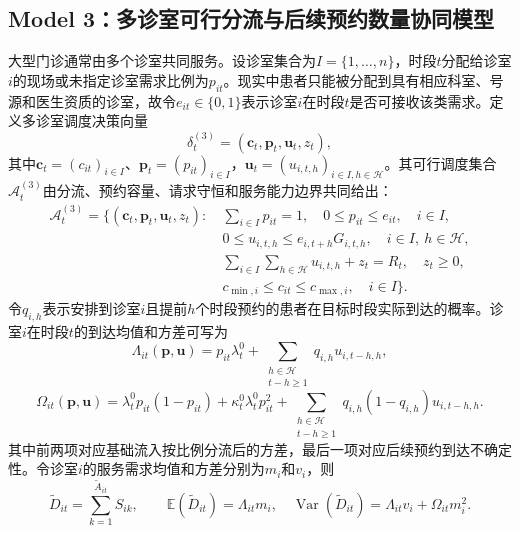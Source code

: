 \documentclass[a4paper,zihao=-4]{ctexart}
\newcommand{\E}{\mathbb{E}}
\newcommand{\Var}{\operatorname{Var}}
\numberwithin{figure}{section}
\numberwithin{table}{section}
\begin{document}
\subsection{Model 3：多诊室可行分流与后续预约数量协同模型}

大型门诊通常由多个诊室共同服务。设诊室集合为$I=\{1,\ldots,n\}$，时段$t$分配给诊室$i$的现场或未指定诊室需求比例为$p_{it}$。现实中患者只能被分配到具有相应科室、号源和医生资质的诊室，故令$e_{it}\in\{0,1\}$表示诊室$i$在时段$t$是否可接收该类需求。定义多诊室调度决策向量
\begin{equation}
\delta_t^{(3)}=(\bm c_t,\bm p_t,\bm u_t,z_t),
\end{equation}
其中$\bm c_t=(c_{it})_{i\in I}$、$\bm p_t=(p_{it})_{i\in I}$，$\bm u_t=(u_{i,t,h})_{i\in I,h\in\mathcal H}$。其可行调度集合$\mathcal A_t^{(3)}$由分流、预约容量、请求守恒和服务能力边界共同给出：
\begin{equation}
\begin{aligned}
\mathcal A_t^{(3)}=\bigg\{(\bm c_t,\bm p_t,\bm u_t,z_t):\ 
&\sum_{i\in I}p_{it}=1,\quad 0\leq p_{it}\leq e_{it},\quad i\in I,\\
&0\leq u_{i,t,h}\leq e_{i,t+h}G_{i,t,h},\quad i\in I,\ h\in\mathcal H,\\
&\sum_{i\in I}\sum_{h\in\mathcal H}u_{i,t,h}+z_t=R_t,\quad z_t\geq0,\\
&c_{\min,i}\leq c_{it}\leq c_{\max,i},\quad i\in I\bigg\}.
\end{aligned}
\label{eq:multi-scheduling-feasible-set}
\end{equation}
令$q_{i,h}$表示安排到诊室$i$且提前$h$个时段预约的患者在目标时段实际到达的概率。诊室$i$在时段$t$的到达均值和方差可写为
\begin{equation}
\Lambda_{it}(\bm p,\bm u)=p_{it}\lambda_t^0+
\sum_{\substack{h\in\mathcal H\\ t-h\geq1}}q_{i,h}u_{i,t-h,h},
\label{eq:multi-arrival-mean}
\end{equation}
\begin{equation}
\Omega_{it}(\bm p,\bm u)
=\lambda_t^0p_{it}(1-p_{it})+\kappa_t^0\lambda_t^0p_{it}^2
+\sum_{\substack{h\in\mathcal H\\ t-h\geq1}}q_{i,h}(1-q_{i,h})u_{i,t-h,h}.
\label{eq:multi-arrival-var}
\end{equation}
其中前两项对应基础流入按比例分流后的方差，最后一项对应后续预约到达不确定性。令诊室$i$的服务需求均值和方差分别为$m_i$和$v_i$，则
\begin{equation}
\tilde D_{it}=\sum_{k=1}^{\tilde A_{it}}S_{ik},\qquad
\E(\tilde D_{it})=\Lambda_{it}m_i,\quad
\Var(\tilde D_{it})=\Lambda_{it}v_i+\Omega_{it}m_i^2.
\end{equation}
\end{document}
